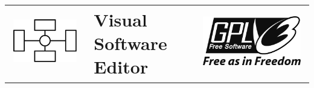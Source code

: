 \documentclass[a4paper,11pt,oneside]{book}
\begin{document}
	\author{}
	\title
	{
		{
			\begin{tabular}{>{\centering\arraybackslash}m{3.8 cm}l>{\centering\arraybackslash}m{3.8 cm}}
				\vspace{0.3 cm}\includegraphics[width=100 pt]{logo} & \textbf{Visual Software Editor} & \vspace{0.3 cm}\includegraphics[width=100 pt]{gplv3_logo_black}
			\end{tabular}
		}
	}
	\date{}
	\maketitle
\end{document}
